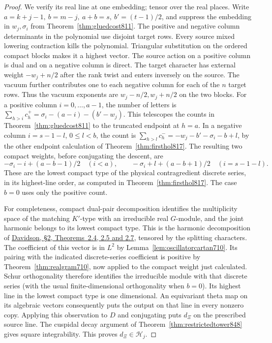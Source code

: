 \documentclass[a4paper,11pt]{article}
\theoremstyle{definition}
\theoremstyle{remark}
\numberwithin{equation}{section}
\begin{document}
\begin{proof}
We verify its real line at one embedding; tensor over the real
places. Write \(a=k+j-1,\ b=m-j,\ a+b=s,\ b'=(t-1)/2\),
and suppress the embedding in \(w_j,\sigma_i\) from
Theorem~\ref{thm:gluedcost811}. The positive and negative
column determinants in the polynomial use disjoint target rows.
Every source mixed lowering contraction kills the polynomial.
Triangular substitution on the ordered compact blocks makes
it a highest vector. The source action on a positive column is
dual and on a negative column is direct. The target character
has external weight \(-w_j+n/2\) after the rank twist and enters
inversely on the source. The vacuum further contributes one to
each negative column for each of the \(n\) target rows. Thus the
vacuum exponents are \(w_j-n/2,w_j+n/2\) on the two blocks.
For a positive column \(i=0,\ldots,a-1\), the number of letters
is \(\sum_{h>i}c_h^+=\sigma_i-(a-i)-(b'-w_j)\).
This telescopes the counts in Theorem~\ref{thm:gluedcost811}
to the truncated endpoint at \(h=a\). In a negative column
\(i=s-1-l\), \(0\le l<b\), the count is
\(\sum_{h>l}c_h^-=-w_j-b'-\sigma_i-b+l\), by the other endpoint
calculation of Theorem~\ref{thm:firsthol817}. The resulting two
compact weights, before conjugating the descent, are
\[
 -\sigma_i-i+(a-b-1)/2\quad(i<a),\qquad
 -\sigma_i+l+(a-b+1)/2\quad(i=s-1-l).
\]
These are the lowest compact type of the physical contragredient
discrete series, in its highest-line order, as computed in
Theorem~\ref{thm:firsthol817}. The case \(b=0\) uses only the
positive count.

For completeness, compact dual-pair decomposition identifies the
multiplicity space of the matching \(K'\)-type with an irreducible
real \(G\)-module, and the joint harmonic belongs to its lowest
compact type. This is the harmonic decomposition of
\href{https://msp.org/pjm/1987/129-1/pjm-v129-n1-p02-s.pdf}
{Davidson, \S2, Theorems~2.4, 2.5 and 2.7}, tensored by the
splitting characters. The coefficient of this vector is in
\(L^2\) by Lemma~\ref{lem:oscillatorcartan710}. Its pairing with
the indicated discrete-series coefficient is positive by
Theorem~\ref{thm:realgram710}, now applied to the compact weight
just calculated. Schur orthogonality therefore identifies the
irreducible module with that discrete series (with the usual
finite-dimensional orthogonality when \(b=0\)). Its highest
line in the lowest compact type is one dimensional. An
equivariant theta map on its algebraic vectors consequently
puts the output on that line in every nonzero copy. Applying
this observation to \(D\) and conjugating puts \(d_\Xi\) on
the prescribed source line. The cuspidal decay argument of
Theorem~\ref{thm:restrictedtower848} gives square integrability.
This proves \(d_\Xi\in\mathcal H_j\).


\end{proof}
\end{document}
